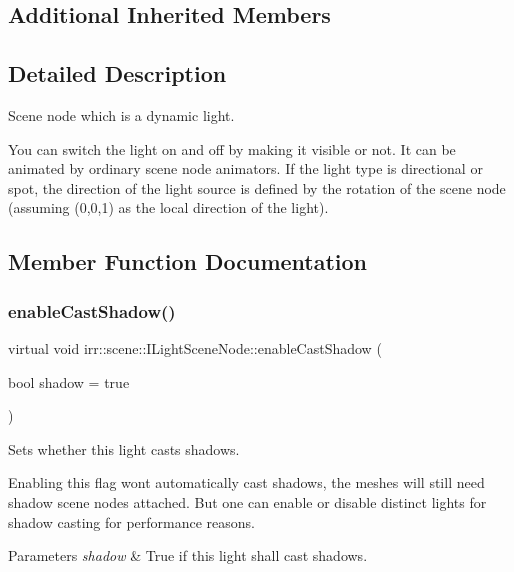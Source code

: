 \subsection*{Additional Inherited Members}


\subsection{Detailed Description}
Scene node which is a dynamic light. 

You can switch the light on and off by making it visible or not. It can be animated by ordinary scene node animators. If the light type is directional or spot, the direction of the light source is defined by the rotation of the scene node (assuming (0,0,1) as the local direction of the light). 

\subsection{Member Function Documentation}
\mbox{\label{classirr_1_1scene_1_1ILightSceneNode_a1520d051fe04bc8c5c8975fb3908161b}} 
\subsubsection{\texorpdfstring{enable\+Cast\+Shadow()}{enableCastShadow()}}
{\footnotesize\ttfamily virtual void irr\+::scene\+::\+I\+Light\+Scene\+Node\+::enable\+Cast\+Shadow (\begin{DoxyParamCaption}\item[{bool}]{shadow = {\ttfamily true} }\end{DoxyParamCaption})\hspace{0.3cm}{\ttfamily [pure virtual]}}



Sets whether this light casts shadows. 

Enabling this flag won\textquotesingle{}t automatically cast shadows, the meshes will still need shadow scene nodes attached. But one can enable or disable distinct lights for shadow casting for performance reasons. 
\begin{DoxyParams}{Parameters}
{\em shadow} & True if this light shall cast shadows. \\
\hline
\end{DoxyParams}
\mbox{\label{classirr_1_1scene_1_1ILightSceneNode_a5ba3a03fc0cfbad7dd8ce2f338a1991a}} 
